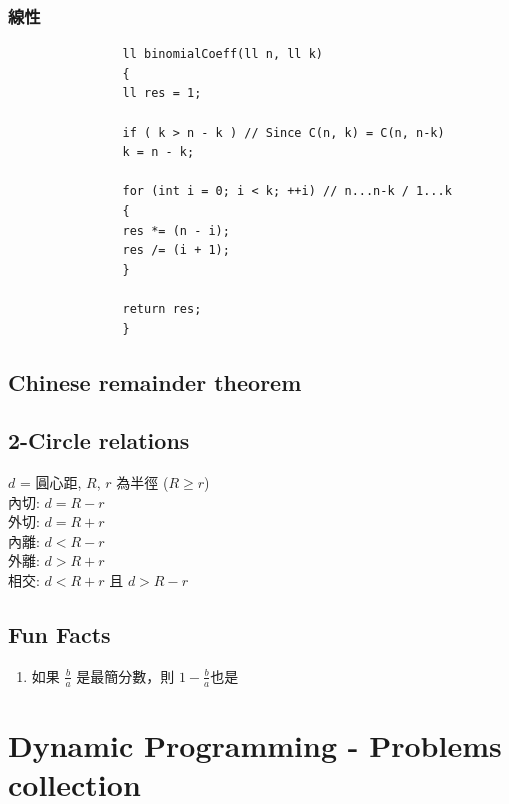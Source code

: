 \documentclass[10pt,oneside]{article}
\begin{document}
\begin{landscape}
\begin{multicols}{2}
				
				\subsubsection{線性}
				
				\begin{verbatim}
				ll binomialCoeff(ll n, ll k)
				{
				ll res = 1;
				
				if ( k > n - k ) // Since C(n, k) = C(n, n-k)
				k = n - k;
				
				for (int i = 0; i < k; ++i) // n...n-k / 1...k
				{
				res *= (n - i);
				res /= (i + 1);
				}
				
				return res;
				}
				\end{verbatim}
				
				\subsection{Chinese remainder theorem}
				
				\subsection{2-Circle relations}
				
				{\normalsize 
					$d$ = 圓心距, $R$, $r$ 為半徑 ($R \geq r$)\\
					內切: $d = R - r$\\
					外切: $d = R + r$\\
					內離: $d < R - r$\\
					外離: $d > R + r$\\
					相交: $d < R + r$ 且 $d > R - r$
				}
				
				\subsection{Fun Facts}
				
				{\normalsize 
					\begin{enumerate}
						\item 如果 $\frac b a$ 是最簡分數，則 $1 - \frac b a$也是%
					\end{enumerate}
				}
				
				
				\section{Dynamic Programming - Problems collection}
				
				
			\end{multicols}
		\end{landscape}
		
	
\end{document}

